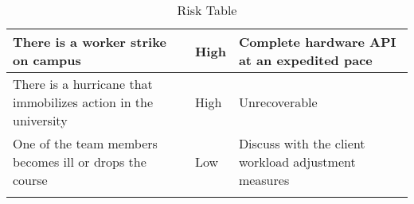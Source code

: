 \begin{longtable}{|m{}|m{}|m{}|}
	There is a worker strike on campus                             & High                & Complete hardware API at an expedited pace                                                                                                                               \\ \hline
	There is a hurricane that immobilizes action in the university & High                & Unrecoverable                                                                                                                                                           \\ \hline
	One of the team members becomes ill or drops the course        & Low                 & Discuss with the client workload adjustment measures                                                                                                                     \\ \hline
	\caption{Risk Table}
	\label{tab:RiskTable}
\end{longtable}
